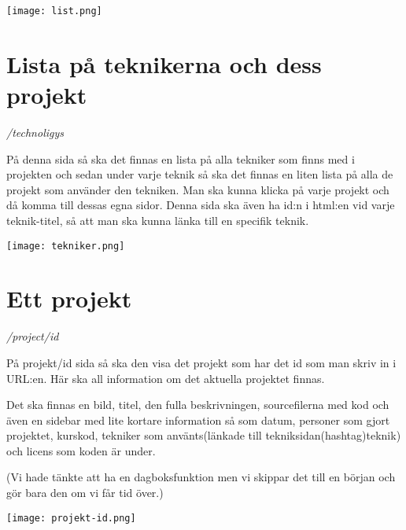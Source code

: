 \documentclass{TDP003mall}
\begin{document}
\texttt{[image: list.png]}


\section{Lista på teknikerna och dess projekt}
\textit{/technoligys}

På denna sida så ska det finnas en lista på alla tekniker som finns med i projekten och sedan under varje teknik så ska det finnas en liten lista på alla de projekt som använder den tekniken. Man ska kunna klicka på varje projekt och då komma till dessas egna sidor. Denna sida ska även ha id:n i html:en vid varje teknik-titel, så att man ska kunna länka till en specifik teknik.

\texttt{[image: tekniker.png]}


\section{Ett projekt}
\textit{/project/id}

På projekt/id sida så ska den visa det projekt som har det id som man skriv in i URL:en. Här ska all information om det aktuella projektet finnas.

Det ska finnas en bild, titel, den fulla beskrivningen, sourcefilerna med kod och även en sidebar med lite kortare information så som datum, personer som gjort projektet, kurskod, tekniker som använts(länkade till tekniksidan(hashtag)teknik) och licens som koden är under.

(Vi hade tänkte att ha en dagboksfunktion men vi skippar det till en början och gör bara den om vi får tid över.)

\texttt{[image: projekt-id.png]}
\end{document}
